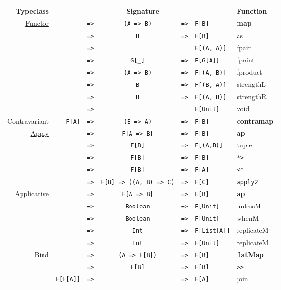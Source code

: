 \documentclass{tufte-handout}
\newcommand{\fa}{F[A]}
\newcommand{\fb}{F[B]}
\newcommand{\rarr}{\texttt{=>}}
\newcommand{\fTwo}[2]{\texttt{#1} & \rarr & & & \texttt{#2}}
\newcommand{\fThree}[3]{\texttt{#1} & \rarr & \texttt{#2} & \rarr & \texttt{#3}}
\newcommand{\sdocUrl}[1]{https://typelevel.org/cats/api/cats/#1.html}
\newcommand{\sdocHref}[1]{\href{\sdocUrl{#1}}{#1}}
\begin{document}
\begin{table}[ht]
  \centering
  \selectfont
  \begin{tabular}{rrcclll}
    Typeclass & \multicolumn{5}{c}{Signature} & Function \\
    \midrule
    \multirow{8}{*}{\sdocHref{Functor}}
      & \fThree{\multirow{8}{*}{\fa}}{(A => B)}{\fb} & \textbf{map} \\
      & \fThree{}{B}{\fb} & as \\
      & \fTwo{}{F[(A, A)]} & fpair \\
      & \fThree{}{G[\_]}{F[G[A]]} & fpoint \\
      & \fThree{}{(A => B)}{F[(A, B)]} & fproduct \\
      & \fThree{}{B}{F[(B, A)]} & strengthL \\
      & \fThree{}{B}{F[(A, B)]} & strengthR \\
      & \fTwo{}{F[Unit]} & void \\[.5cm]
    \sdocHref{Contravariant} & \fThree{\fa}{(B => A)}{\fb} & \textbf{contramap} \\[.5cm]
    \multirow{5}{*}{\sdocHref{Apply}\footnotemark}
      & \fThree{\multirow{5}{*}{\fa}}{F[A => B]}{\fb} & \textbf{ap} \\
      & \fThree{}{\fb}{F[(A,B)]} & tuple \\
      & \fThree{}{\fb}{\fb} & \verb$*>$ \\
      & \fThree{}{\fb}{\fa} & \verb$<*$ \\
      & \fThree{}{F[B] => ((A, B) => C)}{F[C]} & \texttt{apply2}\footnotemark \\[.5cm]
    \multirow{5}{*}{\sdocHref{Applicative}}
      & \fThree{\multirow{5}{*}{\fa}}{F[A => B]}{\fb} & \textbf{ap} \\
      & \fThree{}{Boolean}{F[Unit]} & unlessM \\
      & \fThree{}{Boolean}{F[Unit]} & whenM \\
      & \fThree{}{Int}{F[List[A]]} & replicateM \\
      & \fThree{}{Int}{F[Unit]} & replicateM\_ \\[.5cm]
    \multirow{3}{*}{\sdocHref{Bind}}
      & \fThree{\multirow{2}{*}{\fa}}{(A => F[B])}{\fb} & \textbf{flatMap} \\
      & \fThree{}{\fb}{\fb} & \verb$>>$ \\
      & \fThree{F[F[A]]}{}{\fa} & join \\[.5cm]
  \end{tabular}
\end{table}
\end{document}
